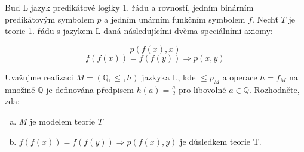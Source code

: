 \subsubsection{}
Buď L jazyk predikátové logiky 1. řádu a rovností, jedním binárním predikátovým
symbolem $p$ a jedním unárním funkčním symbolem $f$.  Nechť $T$ je teorie 1.
řádu s jazykem L daná následujícími dvěma speciálními axiomy:

$$ p(f(x), x)$$
$$f(f(x)) = f(f(y)) \Rightarrow p(x,y)$$

Uvažujme realizaci $M=(\mathbb{Q}, \leq, h)$ jazkyka L, kde $\leq p_{M}$ a
operace $h=f_{M}$ na množině $\mathbb{Q}$ je definována předpisem $h(a) =
\frac{a}{2}$ pro libovolné $a \in \mathbb{Q}$. Rozhodněte, zda:

\begin{enumerate}[a)]
  \item $M$ je modelem teorie $T$
  \item $f(f(x)) = f(f(y)) \Rightarrow p(f(x), y)$ je důsledkem teorie T.
\end{enumerate}
